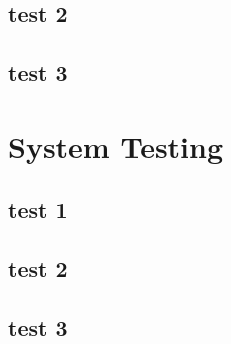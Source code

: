 \documentclass{article}
\begin{document}
\subsection{test 2}
\subsection{test 3}

\section{System Testing}
\subsection{test 1}
\subsection{test 2}
\subsection{test 3}
\end{document}
